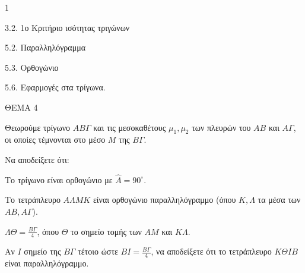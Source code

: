 \begin{ylh}{1}
    \item 3.2. 1ο Κριτήριο ισότητας τριγώνων
    \item 5.2. Παραλληλόγραμμα
    \item 5.3. Ορθογώνιο
    \item 5.6. Εφαρμογές στα τρίγωνα.
\end{ylh}

ΘΕΜΑ 4

Θεωρούμε τρίγωνο $ΑΒ\Gamma$ και τις μεσοκαθέτους $\mu_1, \mu_2$ των πλευρών του $ΑΒ$ και $Α\Gamma$, οι οποίες τέμνονται στο μέσο $M$ της $Β\Gamma$.

\begin{alist}
\item Να αποδείξετε ότι:
\begin{alist}
\item Το τρίγωνο είναι ορθογώνιο με $\widehat{Α} = 90^{\circ}$. 
\item Το τετράπλευρο $A\Lambda M K$ είναι ορθογώνιο παραλληλόγραμμο (όπου $K, \Lambda$ τα μέσα των $ΑΒ, Α\Gamma$). 
\item $\Lambda\Theta = \frac{Β\Gamma}{4}$, όπου $\Theta$ το σημείο τομής των $ΑΜ$ και $K\Lambda$. 
\end{alist}
\item Αν $I$ σημείο της $Β\Gamma$ τέτοιο ώστε $ΒI = \frac{Β\Gamma}{4}$, να αποδείξετε ότι το τετράπλευρο $K\Theta IB$ είναι παραλληλόγραμμο. 

\begin{center}
\end{center}
\end{alist}
